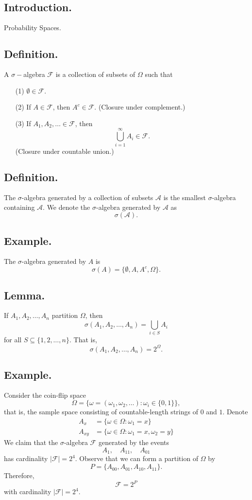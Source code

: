 \documentclass[titlepage]{article}
\begin{document}
\subsection{Introduction.} Probability Spaces.

\subsection{Definition.} A $\sigma-$algebra $\mathcal{F}$ is a collection of subsets of $\Omega$ such that 
\begin{enumerate}
\item[(1)] $\emptyset \in \mathcal{F}$.
\item[(2)] If $A \in \mathcal{F}$, then $A^{c} \in \mathcal{F}$. (Closure under complement.)
\item[(3)] If $A_{1}, A_{2}, \ldots \in \mathcal{F}$, then 
$$\bigcup_{i=1}^{\infty}A_{i} \in \mathcal{F}.$$
(Closure under countable union.)
\end{enumerate}

\subsection{Definition.} The $\sigma$-algebra generated by a collection of subsets $\mathcal{A}$ is the smallest $\sigma$-algebra containing $\mathcal{A}$. We denote the $\sigma$-algebra generated by $\mathcal{A}$ as
$$\sigma(\mathcal{A}).$$

\subsection{Example.} The $\sigma$-algebra generated by $A$ is 
$$\sigma(A) = \{\emptyset, A, A^{c}, \Omega\}.$$

\subsection{Lemma.} If $A_{1}, A_{2}, \ldots, A_{n}$ partition $\Omega$, then 
$$\sigma(A_{1}, A_{2}, \ldots, A_{n}) = \bigcup_{i \in S}A_{i}$$
for all $S \subseteq \{1, 2, \ldots, n\}$. That is, 
$$\sigma(A_{1}, A_{2}, \ldots, A_{n}) = 2^{\Omega}.$$

\subsection{Example.} Consider the coin-flip space 
$$\Omega = \{\omega = (\omega_{1}, \omega_{2}, \ldots): \omega_{i} \in \{0, 1\}\},$$
that is, the sample space consisting of countable-length strings of $0$ and $1$. Denote 
\begin{align*}
         A_{x} &= \{\omega \in \Omega: \omega_{1} = x\} \\
        A_{xy} &= \{\omega \in \Omega: \omega_{1} = x, \omega_{2} = y\}
\end{align*}
We claim that the $\sigma$-algebra $\mathcal{F}$ generated by the events 
$$A_{1}, \quad A_{11}, \quad A_{01}$$
has cardinality $|\mathcal{F}| = 2^{4}$. Observe that we can form a partition of $\Omega$ by 
$$P = \{A_{00}, A_{01}, A_{10}, A_{11}\}.$$
Therefore, 
$$\mathcal{F} = 2^{P}$$
with cardinality $|\mathcal{F}| = 2^{4}$.
\end{document}
